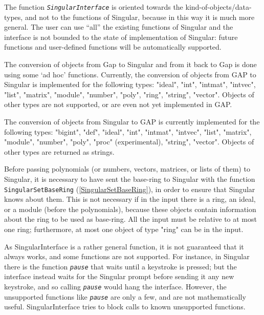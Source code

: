 \documentclass[a4paper,11pt]{report}
\begin{document}
{{{ The function \mbox{\texttt{\mdseries\slshape SingularInterface}} is oriented towards the kind-of-objects/data-types, and not to the functions
of \textsf{Singular}, because in this way it is much more general. The user can use ``all'' the
existing functions of \textsf{Singular} and the interface is not bounded to the state of implementation of \textsf{Singular}: future functions and user-defined functions will be automatically supported. 

 The conversion of objects from Gap to \textsf{Singular} and from it back to Gap is done using some `ad hoc' functions. Currently, the
conversion of objects from \textsf{GAP} to \textsf{Singular} is implemented for the following types: "ideal", "int", "intmat", "intvec",
"list", "matrix", "module", "number", "poly", "ring", "string", "vector".
Objects of other types are not supported, or are even not yet implemented in \textsf{GAP}. 

 The conversion of objects from \textsf{Singular} to \textsf{GAP} is currently implemented for the following types: "bigint", "def", "ideal",
"int", "intmat", "intvec", "list", "matrix", "module", "number", "poly",
"proc" (experimental), "string", "vector". Objects of other types are returned
as strings. 

 Before passing polynomials (or numbers, vectors, matrices, or lists of them)
to \textsf{Singular}, it is necessary to have sent the base-ring to \textsf{Singular} with the function \texttt{SingularSetBaseRing} (\ref{SingularSetBaseRing}), in order to ensure that \textsf{Singular} knows about them. This is not necessary if in the input there is a ring, an
ideal, or a module (before the polynomials), because these objects contain
information about the ring to be used as base-ring. All the input must be
relative to at most one ring; furthermore, at most one object of type "ring"
can be in the input. 

 As SingularInterface is a rather general function, it is not guaranteed that
it always works, and some functions are not supported. For instance, in \textsf{Singular} there is the function \mbox{\texttt{\mdseries\slshape pause}} that waits until a keystroke is pressed; but the interface instead waits for
the \textsf{Singular} prompt before sending it any new keystroke, and so calling \mbox{\texttt{\mdseries\slshape pause}} would hang the interface. However, the unsupported functions like \mbox{\texttt{\mdseries\slshape pause}} are only a few, and are not mathematically useful. SingularInterface tries to
block calls to known unsupported functions. 

}}}
\end{document}
